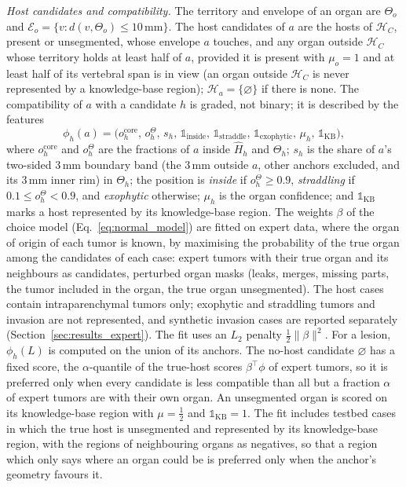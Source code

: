 \documentclass[fleqn,10pt]{olplainarticle}
\begin{document}
\emph{Host candidates and compatibility.} The territory and envelope of an organ are $\Theta_o$ and
$\mathcal{E}_o=\{v:d(v,\Theta_o)\le10\,\mathrm{mm}\}$. The host candidates of $a$ are the hosts of $\mathcal{H}_C$, present
or unsegmented, whose envelope $a$ touches, and any organ outside $\mathcal{H}_C$ whose territory holds at least half of
$a$, provided it is present with $\mu_o=1$ and at least half of its vertebral span is in view (an organ outside
$\mathcal{H}_C$ is never represented by a knowledge-base region); $\mathcal{H}_a=\{\varnothing\}$ if there is none. The compatibility of $a$ with a
candidate $h$ is graded, not binary; it is described by the features
\begin{equation}
\label{eq:compat}
\phi_h(a)=\bigl(o^{\mathrm{core}}_h,\,o^{\Theta}_h,\,s_h,\,\mathbb{1}_{\mathrm{inside}},\,\mathbb{1}_{\mathrm{straddle}},\,
\mathbb{1}_{\mathrm{exophytic}},\,\mu_h,\,\mathbb{1}_{\mathrm{KB}}\bigr),
\end{equation}
where $o^{\mathrm{core}}_h$ and $o^{\Theta}_h$ are the fractions of $a$ inside $\hat H_h$ and $\Theta_h$; $s_h$ is the share
of $a$'s two-sided $3$\,mm boundary band (the $3$\,mm outside $a$, other anchors excluded, and its $3$\,mm inner rim) in
$\Theta_h$; the position is \emph{inside} if $o^{\Theta}_h\ge0.9$, \emph{straddling} if $0.1\le o^{\Theta}_h<0.9$, and
\emph{exophytic} otherwise; $\mu_h$ is the organ confidence; and $\mathbb{1}_{\mathrm{KB}}$ marks a host represented by its
knowledge-base region. The weights $\beta$ of the choice model (Eq.~\eqref{eq:normal_model}) are fitted on expert data,
where the organ of origin of each tumor is known, by maximising the probability of the true organ among the candidates of
each case: expert tumors with their true organ and its neighbours as candidates, perturbed organ masks (leaks, merges,
missing parts, the tumor included in the organ, the true organ unsegmented). The host cases contain
intraparenchymal tumors only; exophytic and straddling tumors and invasion are not represented, and synthetic invasion
cases are reported separately (Section~\ref{sec:results_expert}). The fit uses an $L_2$ penalty $\tfrac12\|\beta\|^2$. For a lesion, $\phi_h(L)$ is computed on the union of its anchors. The no-host candidate $\varnothing$ has a
fixed score, the $\alpha$-quantile of the true-host scores $\beta^\top\phi$ of expert tumors, so it is preferred only when
every candidate is less compatible than all but a fraction $\alpha$ of expert tumors are with their own organ. An
unsegmented organ is scored on its knowledge-base region with $\mu=\tfrac12$ and $\mathbb{1}_{\mathrm{KB}}=1$. The fit
includes testbed cases in which the true host is unsegmented and represented by its knowledge-base region, with the
regions of neighbouring organs as negatives, so that a region which only says where an organ could be is preferred only
when the anchor's geometry favours it.
\end{document}
